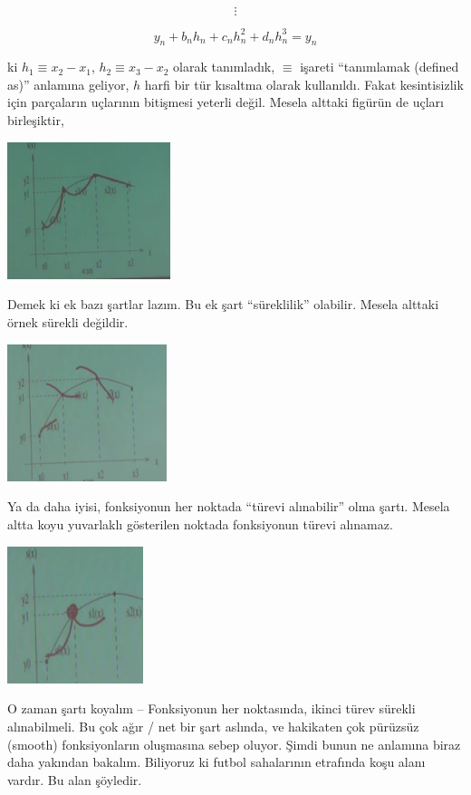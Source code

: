 \documentclass[12pt,fleqn]{article}\usepackage{../../common}
\begin{document}
$$ \vdots $$

$$ y_n + b_nh_n + c_nh_n^2 + d_nh_n^3 = y_n $$

ki $h_1 \equiv x_2 - x_1$, $h_2 \equiv x_3 - x_2$ olarak tanımladık,
$\equiv$ işareti ``tanımlamak (defined as)'' anlamına geliyor, $h$
harfi bir tür kısaltma olarak kullanıldı. Fakat kesintisizlik için
parçaların uçlarının bitişmesi yeterli değil. Mesela alttaki figürün de
uçları birleşiktir,

\includegraphics[height=4cm]{spline3.png}

Demek ki ek bazı şartlar lazım. Bu ek şart ``süreklilik'' olabilir. Mesela
alttaki örnek sürekli değildir.

\includegraphics[height=4cm]{spline5.png}

Ya da daha iyisi, fonksiyonun her noktada ``türevi alınabilir'' olma
şartı. Mesela altta koyu yuvarlaklı gösterilen noktada fonksiyonun türevi
alınamaz.

\includegraphics[height=4cm]{spline4.png}

O zaman şartı koyalım -- Fonksiyonun her noktasında, ikinci türev sürekli
alınabilmeli. Bu çok ağır / net bir şart aslında, ve hakikaten çok pürüzsüz
(smooth) fonksiyonların oluşmasına sebep oluyor. Şimdi bunun ne anlamına
biraz daha yakından bakalım. Biliyoruz ki futbol sahalarının etrafında koşu
alanı vardır. Bu alan şöyledir.
\end{document}

